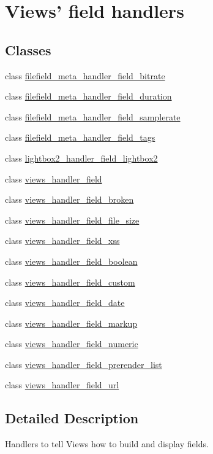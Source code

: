 \hypertarget{group__views__field__handlers}{
\section{Views' field handlers}
\label{group__views__field__handlers}
}
\subsection*{Classes}
\begin{CompactItemize}
\item 
class \hyperlink{classfilefield__meta__handler__field__bitrate}{filefield\_\-meta\_\-handler\_\-field\_\-bitrate}
\item 
class \hyperlink{classfilefield__meta__handler__field__duration}{filefield\_\-meta\_\-handler\_\-field\_\-duration}
\item 
class \hyperlink{classfilefield__meta__handler__field__samplerate}{filefield\_\-meta\_\-handler\_\-field\_\-samplerate}
\item 
class \hyperlink{classfilefield__meta__handler__field__tags}{filefield\_\-meta\_\-handler\_\-field\_\-tags}
\item 
class \hyperlink{classlightbox2__handler__field__lightbox2}{lightbox2\_\-handler\_\-field\_\-lightbox2}
\item 
class \hyperlink{classviews__handler__field}{views\_\-handler\_\-field}
\item 
class \hyperlink{classviews__handler__field__broken}{views\_\-handler\_\-field\_\-broken}
\item 
class \hyperlink{classviews__handler__field__file__size}{views\_\-handler\_\-field\_\-file\_\-size}
\item 
class \hyperlink{classviews__handler__field__xss}{views\_\-handler\_\-field\_\-xss}
\item 
class \hyperlink{classviews__handler__field__boolean}{views\_\-handler\_\-field\_\-boolean}
\item 
class \hyperlink{classviews__handler__field__custom}{views\_\-handler\_\-field\_\-custom}
\item 
class \hyperlink{classviews__handler__field__date}{views\_\-handler\_\-field\_\-date}
\item 
class \hyperlink{classviews__handler__field__markup}{views\_\-handler\_\-field\_\-markup}
\item 
class \hyperlink{classviews__handler__field__numeric}{views\_\-handler\_\-field\_\-numeric}
\item 
class \hyperlink{classviews__handler__field__prerender__list}{views\_\-handler\_\-field\_\-prerender\_\-list}
\item 
class \hyperlink{classviews__handler__field__url}{views\_\-handler\_\-field\_\-url}
\end{CompactItemize}


\subsection{Detailed Description}
Handlers to tell Views how to build and display fields. 